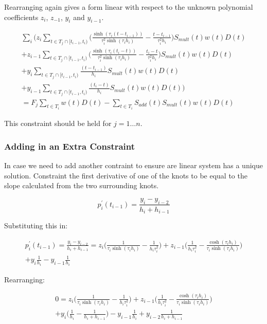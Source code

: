 \documentclass{article}
\begin{document}
Rearranging again gives a form linear with respect to the unknown polynomial coefficients
$z_i$, $z_{-1}$, $y_i$ and $y_{i-1}$.

\begin{multline}
    \sum_i \biggl(  z_i \sum_{t \in T_j \cap [t_{i-1}, t_i)} \biggl( \frac{\sinh(\tau_i (t - t_{i-1}))}{\tau_i^2 \sinh(\tau_i h_i)} 
      - \frac{t - t_{i-1}}{\tau_i^2 h_i} \biggr) S_{mult}(t)w(t)D(t) \\
    + z_{i-1} \sum_{t \in T_j \cap [t_{i-1}, t_i)} \biggl( \frac{\sinh(\tau_i (t_i - t))}{\tau_i^2 \sinh(\tau_i h_i)} 
     - \frac{t_i - t}{\tau_i^2 h_i} \biggr) S_{mult}(t)w(t)D(t) \\
    + y_i \sum_{t \in T_j \cap [t_{i-1}, t_i)} \frac{(t - t_{i-1})}{h_i} S_{mult}(t)w(t)D(t) \\
    + y_{i-1} \sum_{t \in T_j \cap [t_{i-1}, t_i)} \frac{(t_i - t)}{h_i} S_{mult}(t)w(t)D(t) \biggr) \\
    = F_j \sum_{t \in T_i} w(t)D(t) - \sum_{t \in T_i} S_{add}(t) S_{mult}(t)w(t)D(t)
\end{multline}

This constraint should be held for $j=1 \hdots n$.

\subsubsection{Adding in an Extra Constraint}

In case we need to add another contraint to ensure are linear system has a unique solution.
Constraint the first derivative of one of the knots to be equal to the slope calculated
from the two surrounding knots.

\begin{equation}
    p^\prime_i(t_{i-1}) = \frac{y_i - y_{i-2}}{h_i + h_{i-1}}
\end{equation}

Substituting this in:

\begin{multline}
    p^\prime_i(t_{i-1}) = \frac{y_i - y_{i-2}}{h_i + h_{i-1}} = z_i \biggl( \frac{1}{\tau_i \sinh(\tau_i h_i)} - \frac{1}{h_i \tau_i^2} \biggr) 
        + z_{i-1} \biggl( \frac{1}{h_i \tau_i^2} - \frac{ \cosh(\tau_i h_i)}{\tau_i \sinh(\tau_i h_i)} \biggr)\\
        + y_i \frac{1}{h_i} - y_{i - 1} \frac{1}{h_i}
\end{multline}

Rearranging:

\begin{multline}
    0 = z_i \biggl( \frac{1}{\tau_i \sinh(\tau_i h_i)} - \frac{1}{h_i \tau_i^2} \biggr) 
        + z_{i-1} \biggl( \frac{1}{h_i \tau_i^2} - \frac{ \cosh(\tau_i h_i)}{\tau_i \sinh(\tau_i h_i)} \biggr)\\
        + y_i \biggl( \frac{1}{h_i} - \frac{1}{h_i + h_{i-1}} \biggr) - y_{i - 1} \frac{1}{h_i}
        + y_{i-2} \frac{1}{h_i + h_{i-1}}
\end{multline}
\end{document}
